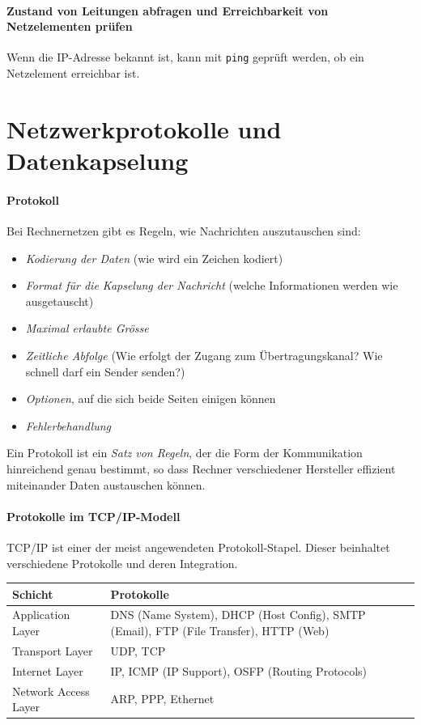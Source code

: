 \documentclass[a4paper,12pt]{article}
\begin{document}
\paragraph{Zustand von Leitungen abfragen und Erreichbarkeit von Netzelementen prüfen}
Wenn die IP-Adresse bekannt ist, kann mit \verb+ping+ geprüft werden, ob ein Netzelement erreichbar ist.


\newpage
\section{Netzwerkprotokolle und Datenkapselung}

\paragraph{Protokoll}
Bei Rechnernetzen gibt es Regeln, wie Nachrichten auszutauschen sind:
\begin{itemize}
\item \emph{Kodierung der Daten} (wie wird ein Zeichen kodiert)
\item \emph{Format für die Kapselung der Nachricht} (welche Informationen werden wie ausgetauscht)
\item \emph{Maximal erlaubte Grösse}
\item \emph{Zeitliche Abfolge} (Wie erfolgt der Zugang zum Übertragungskanal? Wie schnell darf ein Sender senden?)
\item \emph{Optionen}, auf die sich beide Seiten einigen können
\item \emph{Fehlerbehandlung}
\end{itemize}

Ein Protokoll ist ein \emph{Satz von Regeln}, der die Form der Kommunikation hinreichend genau bestimmt, so dass Rechner verschiedener Hersteller effizient miteinander Daten austauschen können.

\paragraph{Protokolle im TCP/IP-Modell}
TCP/IP ist einer der meist angewendeten Protokoll-Stapel. Dieser beinhaltet verschiedene Protokolle und deren Integration.

\begin{center}
\begin{tabular}{ | m{2cm} |m{7cm}| } 
Schicht & Protokolle\\ 
\hline
Application Layer & DNS (Name System), DHCP (Host Config), SMTP (Email), FTP (File Transfer), HTTP (Web) \\
Transport Layer & UDP, TCP \\
Internet Layer & IP, ICMP (IP Support), OSFP (Routing Protocols) \\
Network Access Layer & ARP, PPP, Ethernet\\
\end{tabular}
\end{center}
\end{document}
